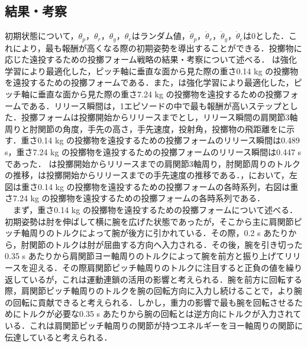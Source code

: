 \begin{small}
\subsection{結果・考察}
初期状態について，$\theta_{p}$，$\theta_{r}$，$\theta_{y}$，$\theta_{e}$はランダム値，$\dot{\theta}_{p}$，$\dot{\theta}_{r}$，$\dot{\theta}_{y}$，$\dot{\theta}_{e}$は0とした．これにより，最も報酬が高くなる際の初期姿勢を導出することができる．投擲物に応じた遠投するための投擲フォーム戦略の結果・考察について述べる．
は強化学習により最適化した，ピッチ軸に垂直な面から見た際の重さ0.14 kg の投擲物を遠投するための投擲フォームである．また，は強化学習により最適化した，ピッチ軸に垂直な面から見た際の重さ7.24 kg の投擲物を遠投するための投擲フォームである．リリース瞬間は，1エピソードの中で最も報酬が高いステップとした．投擲フォームは投擲開始からリリースまでとし，リリース瞬間の肩関節3軸周りと肘関節の角度，手先の高さ，手先速度，投射角，投擲物の飛距離をに示す．重さ0.14 kg の投擲物を遠投するための投擲フォームのリリース瞬間は0.489 s，重さ7.24 kg の投擲物を遠投するための投擲フォームのリリース瞬間は0.447 sであった．
は投擲開始からリリースまでの肩関節3軸周り，肘関節周りのトルクの推移，は投擲開始からリリースまでの手先速度の推移である．，において，左図は重さ0.14 kg の投擲物を遠投するための投擲フォームの各時系列，右図は重さ7.24 kg の投擲物を遠投するための投擲フォームの各時系列である．\\
　まず，重さ0.14 kg の投擲物を遠投するための投擲フォームについて述べる．初期姿勢は肘を伸ばして横に腕を広げた状態であったが，そこから主に肩関節ピッチ軸周りのトルクによって腕が後方に引かれている．その際，0.2 s あたりから，肘関節のトルクは肘が屈曲する方向へ入力される．その後，腕を引き切った0.35 s あたりから肩関節ヨー軸周りのトルクによって腕を前方と振り上げてリリースを迎える．その際肩関節ピッチ軸周りのトルクに注目すると正負の値を繰り返しているが，これは運動連鎖の活用の影響と考えられる．腕を前方に回転する際，肩関節ピッチ軸周りのトルクを腕の回転方向に入力し続けることで，より腕の回転に貢献できると考えられる．しかし，重力の影響で最も腕を回転させるためにトルクが必要な0.35 s あたりから腕の回転とは逆方向にトルクが入力されている．これは肩関節ピッチ軸周りの関節が持つエネルギーをヨー軸周りの関節に伝達していると考えられる．\\

\end{small}

